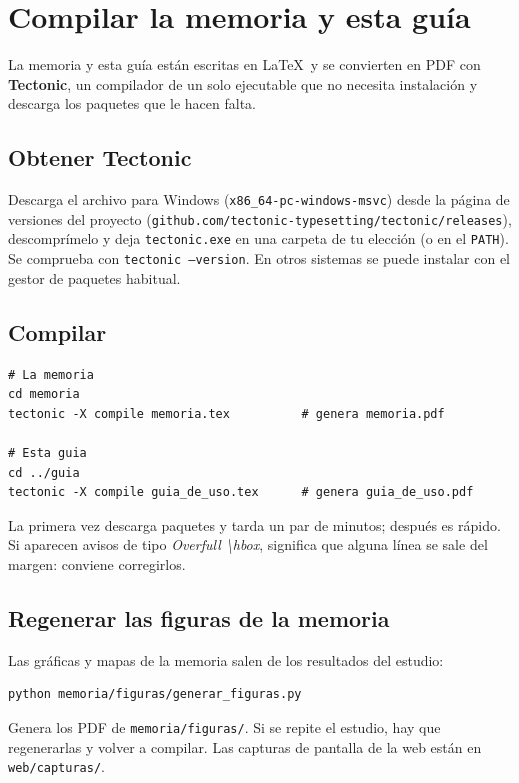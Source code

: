 \documentclass[11pt,a4paper,twoside,openany]{report}
\begin{document}
\chapter{Compilar la memoria y esta guía}\label{g:memoria}

La memoria y esta guía están escritas en \LaTeX\ y se convierten en PDF con \textbf{Tectonic}, un compilador de un solo ejecutable que no necesita instalación y descarga los paquetes que le hacen falta.

\section{Obtener Tectonic}

Descarga el archivo para Windows (\texttt{x86\_64-pc-windows-msvc}) desde la página de versiones del proyecto (\texttt{github.com/tectonic-typesetting/tectonic/releases}), descomprímelo y deja \texttt{tectonic.exe} en una carpeta de tu elección (o en el \texttt{PATH}). Se comprueba con \texttt{tectonic --version}. En otros sistemas se puede instalar con el gestor de paquetes habitual.

\section{Compilar}

\begin{lstlisting}
# La memoria
cd memoria
tectonic -X compile memoria.tex          # genera memoria.pdf

# Esta guia
cd ../guia
tectonic -X compile guia_de_uso.tex      # genera guia_de_uso.pdf
\end{lstlisting}

La primera vez descarga paquetes y tarda un par de minutos; después es rápido. Si aparecen avisos de tipo \emph{Overfull \textbackslash hbox}, significa que alguna línea se sale del margen: conviene corregirlos.

\section{Regenerar las figuras de la memoria}

Las gráficas y mapas de la memoria salen de los resultados del estudio:
\begin{lstlisting}
python memoria/figuras/generar_figuras.py
\end{lstlisting}
Genera los PDF de \texttt{memoria/figuras/}. Si se repite el estudio, hay que regenerarlas y volver a compilar. Las capturas de pantalla de la web están en \texttt{web/capturas/}.
\end{document}
